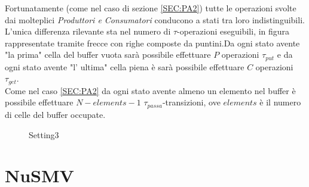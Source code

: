 \documentclass[a4paper]{article}
\begin{document}
Fortunatamente (come nel caso di sezione \ref{SEC:PA2}) tutte le operazioni svolte dai molteplici \textit{Produttori \textit{e} Consumatori} conducono a stati tra loro indistinguibili.\\
L'unica differenza rilevante sta nel numero di $\tau$-operazioni eseguibili, in figura rappresentate tramite frecce con righe composte da puntini.Da ogni stato avente "la prima" cella del buffer vuota sarà possibile effettuare $P$ operazioni $\tau_{put}$ e da ogni stato avente "l' ultima" cella piena è sarà possibile effettuare $C$ operazioni $\tau_{get}$.\\
Come nel caso \ref{SEC:PA2} da ogni stato avente almeno un elemento nel buffer è possibile effettuare $N - elements - 1$ $\tau_{passa}$-transizioni, ove $elements$ è il numero di celle del buffer occupate.\\
\begin{figure}[!ht]
\centering
{}
\caption{Setting3} \label{FIG:PA3_DG}
\end{figure}
\newpage

\section{NuSMV}
\end{document}
